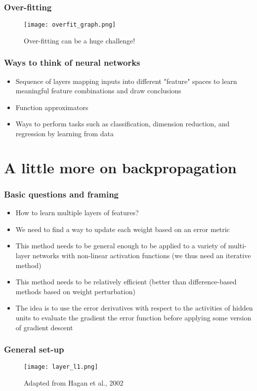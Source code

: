 \documentclass{beamer}
\begin{document}
\begin{frame}
	\frametitle{Over-fitting}
	\begin{figure}
		\texttt{[image: overfit\_graph.png]}
		\caption{Over-fitting can be a huge challenge!}
	\end{figure}
\end{frame}

\begin{frame}
	\frametitle{Ways to think of neural networks}
    \begin{itemize}
    	\item Sequence of layers mapping inputs into different "feature" spaces to learn meaningful feature combinations and draw conclusions
        \item Function approximators
        \item Ways to perform tasks such as classification, dimension reduction, and regression by learning from data
     \end{itemize}
\end{frame}

\section{A little more on backpropagation}
\begin{frame}
	\frametitle{Basic questions and framing}
    \begin{itemize}
    	\item How to learn multiple layers of features?
        \item We need to find a way to update each weight based on an error metric
        \item This method needs to be general enough to be applied to a variety of multi-layer networks with non-linear activation functions (we thus need an iterative method) 
        \item This method needs to be relatively efficient (better than difference-based methods based on weight perturbation)
        \item The idea is to use the error derivatives with respect to the activities of hidden units to evaluate the gradient the error function before applying some version of gradient descent
  \end{itemize}
\end{frame}

\begin{frame}
	\frametitle{General set-up}
  \begin{figure}       		        \texttt{[image: layer\_l1.png]}
 \caption{Adapted from Hagan et al., 2002}
 \end{figure}
\end{frame}
\end{document}
